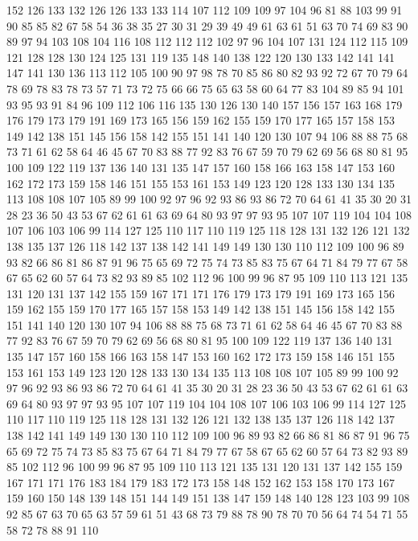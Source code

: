 152 126 133 132 126 126 133 133 114 107 112 109 109 97 104 96 81 88 103 99
91 90 85 85 82 67 58 54 36 38 35 27 30 31 29 39 49 49 61 63
61 51 63 70 74 69 83 90 89 97 94 103 108 104 116 108 112 112 112 102
97 96 104 107 131 124 112 115 109 121 128 128 130 124 125 131 119 135 148 140
138 122 120 130 133 142 141 141 147 141 130 136 113 112 105 100 90 97 98 78
70 85 86 80 82 93 92 72 67 70 79 64 78 69 78 83 78 73 57 71
73 72 75 66 66 75 65 63 58 60 64 77 83 104 89 85 94 101 93 95
93 91 84 96 109 112 106 116 135 130 126 130 140 157 156 157 163 168 179 176
179 173 179 191 169 173 165 156 159 162 155 159 170 177 165 157 158 153 149 142
138 151 145 156 158 142 155 151 141 140 120 130 107 94 106 88 88 75 68 73
71 61 62 58 64 46 45 67 70 83 88 77 92 83 76 67 59 70 79 62
69 56 68 80 81 95 100 109 122 119 137 136 140 131 135 147 157 160 158 166
163 158 147 153 160 162 172 173 159 158 146 151 155 153 161 153 149 123 120 128
133 130 134 135 113 108 108 107 105 89 99 100 92 97 96 92 93 86 93 86
72 70 64 61 41 35 30 20 31 28 23 36 50 43 53 67 62 61 61 63
69 64 80 93 97 97 93 95 107 107 119 104 104 108 107 106 103 106 99 114
127 125 110 117 110 119 125 118 128 131 132 126 121 132 138 135 137 126 118 142
137 138 142 141 149 149 130 130 110 112 109 100 96 89 93 82 66 86 81 86
87 91 96 75 65 69 72 75 74 73 85 83 75 67 64 71 84 79 77 67
58 67 65 62 60 57 64 73 82 93 89 85 102 112 96 100 99 96 87 95
109 110 113 121 135 131 120 131 137 142 155 159 167 171 171 176 179 173 179 191
169 173 165 156 159 162 155 159 170 177 165 157 158 153 149 142 138 151 145 156
158 142 155 151 141 140 120 130 107 94 106 88 88 75 68 73 71 61 62 58
64 46 45 67 70 83 88 77 92 83 76 67 59 70 79 62 69 56 68 80
81 95 100 109 122 119 137 136 140 131 135 147 157 160 158 166 163 158 147 153
160 162 172 173 159 158 146 151 155 153 161 153 149 123 120 128 133 130 134 135
113 108 108 107 105 89 99 100 92 97 96 92 93 86 93 86 72 70 64 61
41 35 30 20 31 28 23 36 50 43 53 67 62 61 61 63 69 64 80 93
97 97 93 95 107 107 119 104 104 108 107 106 103 106 99 114 127 125 110 117
110 119 125 118 128 131 132 126 121 132 138 135 137 126 118 142 137 138 142 141
149 149 130 130 110 112 109 100 96 89 93 82 66 86 81 86 87 91 96 75
65 69 72 75 74 73 85 83 75 67 64 71 84 79 77 67 58 67 65 62
60 57 64 73 82 93 89 85 102 112 96 100 99 96 87 95 109 110 113 121
135 131 120 131 137 142 155 159 167 171 171 176 183 184 179 183 172 173 158 148
152 162 153 158 170 173 167 159 160 150 148 139 148 151 144 149 151 138 147 159
148 140 128 123 103 99 108 92 85 67 63 70 65 63 57 59 61 51 43 68
73 79 88 78 90 78 70 70 56 64 74 54 71 55 58 72 78 88 91 110
